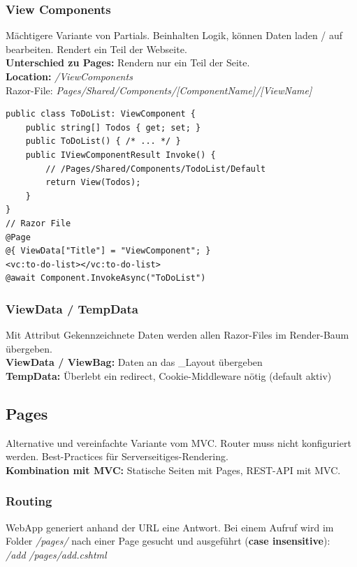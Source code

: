 \subsubsection{View Components}
Mächtigere Variante von Partials. 
Beinhalten Logik, können Daten laden / auf bearbeiten.
Rendert ein Teil der Webseite.\\
\textbf{Unterschied zu Pages:} Rendern nur ein Teil der Seite.\\
\textbf{Location:} \textit{/ViewComponents}\\
Razor-File: \textit{Pages/Shared/Components/[ComponentName]/[ViewName]}
\begin{lstlisting}
public class ToDoList: ViewComponent {
    public string[] Todos { get; set; }
    public ToDoList() { /* ... */ }
    public IViewComponentResult Invoke() {
        // /Pages/Shared/Components/TodoList/Default
        return View(Todos);
    }
}
// Razor File
@Page
@{ ViewData["Title"] = "ViewComponent"; }
<vc:to-do-list></vc:to-do-list>
@await Component.InvokeAsync("ToDoList")
\end{lstlisting}

\subsubsection{ViewData / TempData}
Mit Attribut Gekennzeichnete Daten werden allen Razor-Files im Render-Baum übergeben.\\
\textbf{ViewData / ViewBag:} Daten an das \_Layout übergeben\\
\textbf{TempData:} Überlebt ein redirect, Cookie-Middleware nötig (default aktiv)

\subsection{Pages}
Alternative und vereinfachte Variante vom MVC.
Router muss nicht konfiguriert werden.
Best-Practices für Serverseitiges-Rendering.\\
\textbf{Kombination mit MVC:} Statische Seiten mit Pages, REST-API mit MVC.

\subsubsection{Routing}
WebApp generiert anhand der URL eine Antwort.
Bei einem Aufruf wird im Folder \textit{/pages/} nach einer Page gesucht und ausgeführt (\textbf{case insensitive}):\\
\textit{/add} \textrightarrow \textit{/pages/add.cshtml}

